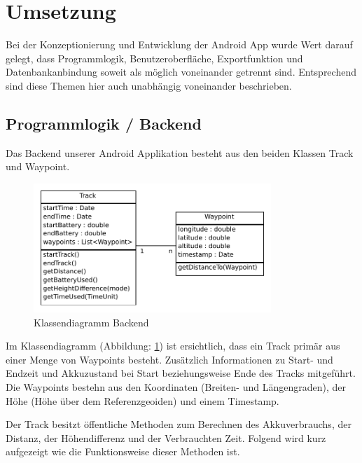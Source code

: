 \clearpage
\section{Umsetzung}
Bei der Konzeptionierung und Entwicklung der Android App wurde Wert darauf gelegt, dass Programmlogik, Benutzeroberfläche, Exportfunktion und Datenbankanbindung soweit als möglich voneinander getrennt sind. Entsprechend sind diese Themen hier auch unabhängig voneinander beschrieben.

\subsection{Programmlogik / Backend}
\label{subsec:programmlogikbackend}
Das Backend unserer Android Applikation besteht aus den beiden Klassen Track und Waypoint. 

\begin{figure}[h]
  \centering
  \includegraphics[width=0.8\textwidth]{images/classdiag_backend.pdf}
  \caption[Klassendiagramm Backend]{Klassendiagramm Backend}
  \label{fig:classdiag_backend}
\end{figure}

Im Klassendiagramm (Abbildung: \ref{fig:classdiag_backend}) ist ersichtlich, dass ein Track primär aus einer Menge von Waypoints besteht. Zusätzlich Informationen zu Start- und Endzeit und Akkuzustand bei Start beziehungsweise Ende des Tracks mitgeführt. Die Waypoints bestehn aus den Koordinaten (Breiten- und Längengraden), der Höhe (Höhe über dem Referenzgeoiden) und einem Timestamp.

Der Track besitzt öffentliche Methoden zum Berechnen des Akkuverbrauchs, der Distanz, der Höhendifferenz und der Verbrauchten Zeit. Folgend wird kurz aufgezeigt wie die Funktionsweise dieser Methoden ist.

